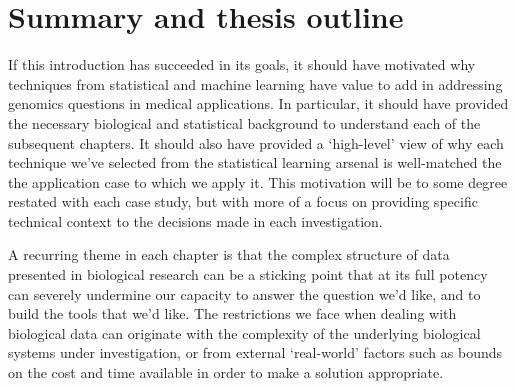 \documentclass[thesis.tex]{subfiles}
\begin{document}


\section{Summary and thesis outline}
If this introduction has succeeded in its goals, it should have motivated why techniques from statistical and machine learning have value to add in addressing genomics questions in medical applications. In particular, it should have provided the necessary biological and statistical background to understand each of the subsequent chapters. It should also have provided a `high-level' view of why each technique we've selected from the statistical learning arsenal is well-matched the the application case to which we apply it. This motivation will be to some degree restated with each case study, but with more of a focus on providing specific technical context to the decisions made in each investigation.

A recurring theme in each chapter is that the complex structure of data presented in biological research can be a sticking point that at its full potency can severely undermine our capacity to answer the question we'd like, and to build the tools that we'd like. The restrictions we face when dealing with biological data can originate with the complexity of the underlying biological systems under investigation, or from external `real-world' factors such as bounds on the cost and time available in order to make a solution appropriate.
\end{document}
